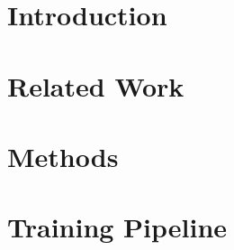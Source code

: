 \documentclass[fleqn,moreauthors,10pt]{ds_report}
\affiliation{\textit{Advisors: Slavko Žitnik}}
\begin{document}
\flushbottom 

\maketitle 

\thispagestyle{empty} 

\section*{Introduction}

\section*{Related Work}

\section*{Methods}





\section*{Training Pipeline}

\end{document}
